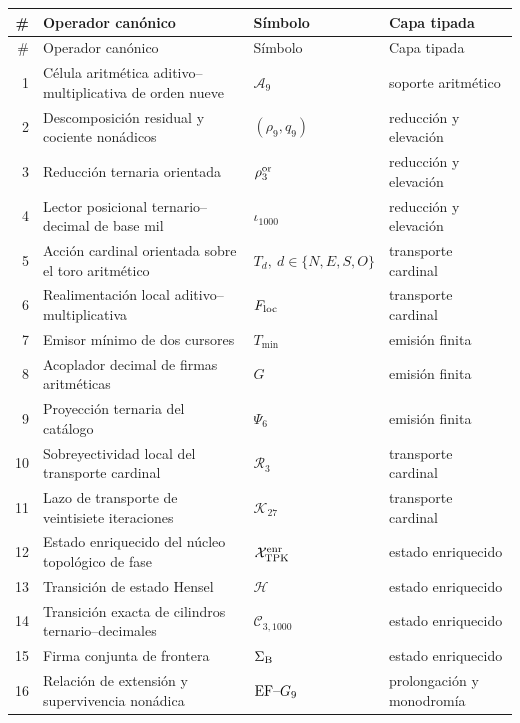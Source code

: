 \begingroup
\footnotesize
\renewcommand{\arraystretch}{1.06}
\enlargethispage{2\baselineskip}
\begin{longtable}{@{}r >{\raggedright\arraybackslash}p{}
  >{\raggedright\arraybackslash}p{}
  >{\raggedright\arraybackslash}p{}@{}}
\toprule
\# & Operador canónico & Símbolo & Capa tipada \\
\midrule
\endfirsthead
\toprule
\# & Operador canónico & Símbolo & Capa tipada \\
\midrule
\endhead
1 & Célula aritmética aditivo--multiplicativa de orden nueve
  & \(\mathcal A_9\) & soporte aritmético \\
2 & Descomposición residual y cociente nonádicos
  & \((\rho_9,q_9)\) & reducción y elevación \\
3 & Reducción ternaria orientada
  & \(\rho_3^{\rm or}\) & reducción y elevación \\
4 & Lector posicional ternario--decimal de base mil
  & \(\iota_{1000}\) & reducción y elevación \\
5 & Acción cardinal orientada sobre el toro aritmético
  & \(T_d,\ d\in\{N,E,S,O\}\) & transporte cardinal \\
6 & Realimentación local aditivo--multiplicativa
  & \(F_{\rm loc}\) & transporte cardinal \\
7 & Emisor mínimo de dos cursores
  & \(T_{\min}\) & emisión finita \\
8 & Acoplador decimal de firmas aritméticas
  & \(G\) & emisión finita \\
9 & Proyección ternaria del catálogo
  & \(\Psi_6\) & emisión finita \\
10 & Sobreyectividad local del transporte cardinal
  & \(\mathcal R_3\) & transporte cardinal \\
11 & Lazo de transporte de veintisiete iteraciones
  & \(\mathcal K_{27}\) & transporte cardinal \\
12 & Estado enriquecido del núcleo topológico de fase
  & \(\mathcal X_{\rm TPK}^{\rm enr}\) & estado enriquecido \\
13 & Transición de estado Hensel
  & \(\mathcal H\) & estado enriquecido \\
14 & Transición exacta de cilindros ternario--decimales
  & \(\mathcal C_{3,1000}\) & estado enriquecido \\
15 & Firma conjunta de frontera
  & \(\Sigma_{\rm B}\) & estado enriquecido \\
16 & Relación de extensión y supervivencia nonádica
  & \({\rm EF}\text{--}G_9\) & prolongación y monodromía \\

\end{longtable}

